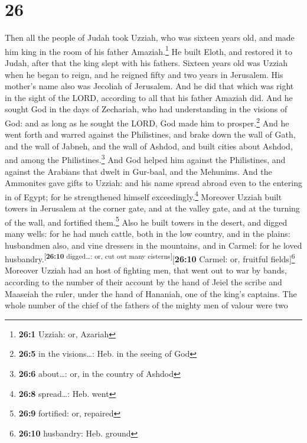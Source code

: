 \hypertarget{section-25}{%
\section{26}\label{section-25}}

 Then all the people of Judah took Uzziah, who was sixteen
years old, and made him king in the room of his father
Amaziah.\footnote{\textbf{26:1} Uzziah: or, Azariah}  He
built Eloth, and restored it to Judah, after that the king slept with
his fathers.  Sixteen years old was Uzziah when he began
to reign, and he reigned fifty and two years in Jerusalem. His mother's
name also was Jecoliah of Jerusalem.  And he did that
which was right in the sight of the LORD, according to all that his
father Amaziah did.  And he sought God in the days of
Zechariah, who had understanding in the visions of God: and as long as
he sought the LORD, God made him to prosper.\footnote{\textbf{26:5} in
  the visions\ldots: Heb. in the seeing of God}  And he
went forth and warred against the Philistines, and brake down the wall
of Gath, and the wall of Jabneh, and the wall of Ashdod, and built
cities about Ashdod, and among the Philistines.\footnote{\textbf{26:6}
  about\ldots: or, in the country of Ashdod}  And God
helped him against the Philistines, and against the Arabians that dwelt
in Gur-baal, and the Mehunims.  And the Ammonites gave
gifts to Uzziah: and his name spread abroad even to the entering in of
Egypt; for he strengthened himself exceedingly.\footnote{\textbf{26:8}
  spread\ldots: Heb. went}  Moreover Uzziah built towers
in Jerusalem at the corner gate, and at the valley gate, and at the
turning of the wall, and fortified them.\footnote{\textbf{26:9}
  fortified: or, repaired}  Also he built towers in the
desert, and digged many wells: for he had much cattle, both in the low
country, and in the plains: husbandmen also, and vine dressers in the
mountains, and in Carmel: for he loved
husbandry.\textsuperscript{{[}\textbf{26:10} digged\ldots: or, cut out
many cisterns{]}}{[}\textbf{26:10} Carmel: or, fruitful
fields{]}\footnote{\textbf{26:10} husbandry: Heb. ground}
 Moreover Uzziah had an host of fighting men, that went
out to war by bands, according to the number of their account by the
hand of Jeiel the scribe and Maaseiah the ruler, under the hand of
Hananiah, one of the king's captains.  The whole number
of the chief of the fathers of the mighty men of valour were two
